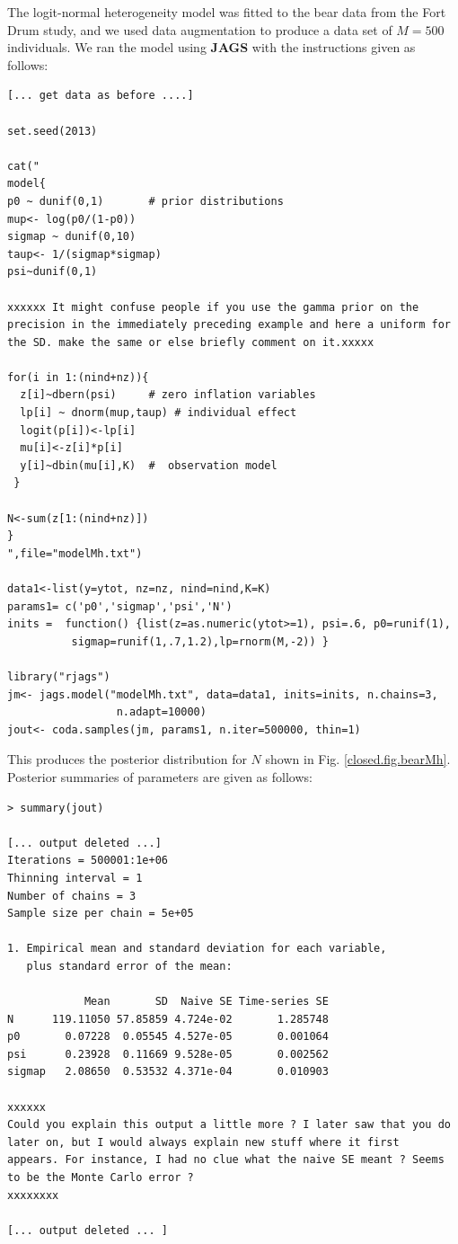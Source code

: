 The logit-normal heterogeneity model was fitted to the bear data from
the Fort Drum study, and we used data augmentation to produce a data
set of $M=500$ individuals.  We ran the model using {\bf JAGS} with
the instructions given as follows:
{\small
\begin{verbatim}
[... get data as before ....]

set.seed(2013)

cat("
model{
p0 ~ dunif(0,1)       # prior distributions
mup<- log(p0/(1-p0))
sigmap ~ dunif(0,10)
taup<- 1/(sigmap*sigmap)
psi~dunif(0,1)

xxxxxx It might confuse people if you use the gamma prior on the precision in the immediately preceding example and here a uniform for the SD. make the same or else briefly comment on it.xxxxx

for(i in 1:(nind+nz)){
  z[i]~dbern(psi)     # zero inflation variables
  lp[i] ~ dnorm(mup,taup) # individual effect
  logit(p[i])<-lp[i]
  mu[i]<-z[i]*p[i]
  y[i]~dbin(mu[i],K)  #  observation model    
 }

N<-sum(z[1:(nind+nz)])
}
",file="modelMh.txt")

data1<-list(y=ytot, nz=nz, nind=nind,K=K) 
params1= c('p0','sigmap','psi','N')
inits =  function() {list(z=as.numeric(ytot>=1), psi=.6, p0=runif(1),
          sigmap=runif(1,.7,1.2),lp=rnorm(M,-2)) }

library("rjags")
jm<- jags.model("modelMh.txt", data=data1, inits=inits, n.chains=3,
                 n.adapt=10000)
jout<- coda.samples(jm, params1, n.iter=500000, thin=1)
\end{verbatim}
}
This produces the posterior distribution for $N$ shown
in Fig. \ref{closed.fig.bearMh}. Posterior summaries of parameters are
given as follows:
{\small
\begin{verbatim}
> summary(jout)

[... output deleted ...]
Iterations = 500001:1e+06
Thinning interval = 1 
Number of chains = 3 
Sample size per chain = 5e+05 

1. Empirical mean and standard deviation for each variable,
   plus standard error of the mean:

            Mean       SD  Naive SE Time-series SE
N      119.11050 57.85859 4.724e-02       1.285748
p0       0.07228  0.05545 4.527e-05       0.001064
psi      0.23928  0.11669 9.528e-05       0.002562
sigmap   2.08650  0.53532 4.371e-04       0.010903

xxxxxx
Could you explain this output a little more ? I later saw that you do
later on, but I would always explain new stuff where it first
appears. For instance, I had no clue what the naive SE meant ? Seems
to be the Monte Carlo error ?
xxxxxxxx

[... output deleted ... ]
\end{verbatim}
}

